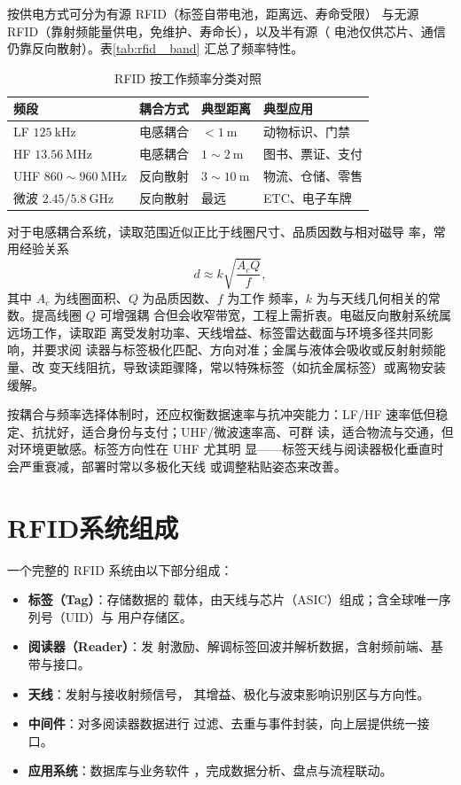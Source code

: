 按供电方式可分为有源 RFID（标签自带电池，距离远、寿命受限）
与无源 RFID（靠射频能量供电，免维护、寿命长），以及半有源（
电池仅供芯片、通信仍靠反向散射）。表\ref{tab:rfid_
band} 汇总了频率特性。

\begin{table}[htbp]
\centering
\caption{RFID 按工作频率分类对照}
\label{tab:rfid_band}
\begin{tabular}{|p{2.4cm}|p{3.0cm}|p{3.2cm}|p{4.0cm}|}
\hline
\textbf{频段} & \textbf{耦合方式} & \textbf{典型距离} & \textbf{典型应用} \\
\hline
LF $125\ \mathrm{kHz}$ & 电感耦合 & $<1\ \mathrm{m}$ & 动物标识、门禁 \\
\hline
HF $13.56\ \mathrm{MHz}$ & 电感耦合 & $1\sim 2\ \mathrm{m}$ & 图书、票证、支付 \\
\hline
UHF $860\sim 960\ \mathrm{MHz}$ & 反向散射 & $3\sim 10\ \mathrm{m}$ & 物流、仓储、零售 \\
\hline
微波 $2.45/5.8\ \mathrm{GHz}$ & 反向散射 & 最远 & ETC、电子车牌 \\
\hline
\end{tabular}
\end{table}

对于电感耦合系统，读取范围近似正比于线圈尺寸、品质因数与相对磁导
率，常用经验关系
\begin{equation}
d \approx k\sqrt{\frac{A_c Q}{f}},
\end{equation}
其中 $A_c$ 为线圈面积、$Q$ 为品质因数、$f$ 为工作
频率，$k$ 为与天线几何相关的常数。提高线圈 $Q$ 可增强耦
合但会收窄带宽，工程上需折衷。电磁反向散射系统属远场工作，读取距
离受发射功率、天线增益、标签雷达截面与环境多径共同影响，并要求阅
读器与标签极化匹配、方向对准；金属与液体会吸收或反射射频能量、改
变天线阻抗，导致读距骤降，常以特殊标签（如抗金属标签）或离物安装
缓解。

按耦合与频率选择体制时，还应权衡数据速率与抗冲突能力：LF/HF
 速率低但稳定、抗扰好，适合身份与支付；UHF/微波速率高、可群
读，适合物流与交通，但对环境更敏感。标签方向性在 UHF 尤其明
显——标签天线与阅读器极化垂直时会严重衰减，部署时常以多极化天线
或调整粘贴姿态来改善。

\section{RFID系统组成}
\label{sec:rfid_components}

一个完整的 RFID 系统由以下部分组成：

\begin{itemize}
    \item \textbf{标签（Tag）}：存储数据的
载体，由天线与芯片（ASIC）组成；含全球唯一序列号（UID）与
用户存储区。
    \item \textbf{阅读器（Reader）}：发
射激励、解调标签回波并解析数据，含射频前端、基带与接口。
    \item \textbf{天线}：发射与接收射频信号，
其增益、极化与波束影响识别区与方向性。
    \item \textbf{中间件}：对多阅读器数据进行
过滤、去重与事件封装，向上层提供统一接口。
    \item \textbf{应用系统}：数据库与业务软件
，完成数据分析、盘点与流程联动。
\end{itemize}

